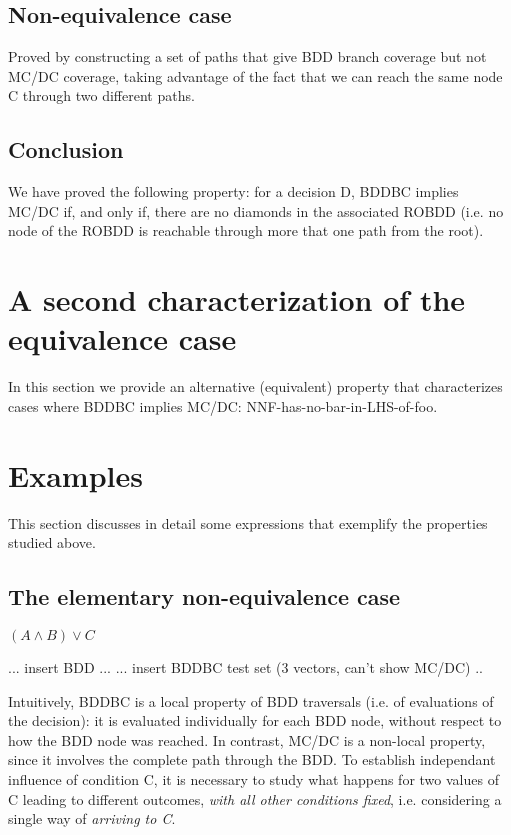 \documentclass[a4paper,12pt,twoside]{article}
\begin{document}
\subsection{Non-equivalence case}

Proved by constructing a set of paths that give BDD branch coverage but
not MC/DC coverage, taking advantage of the fact that we can reach the
same node C through two different paths.

\subsection{Conclusion}

We have proved the following property: for a decision D, BDDBC implies
MC/DC if, and only if, there are no diamonds in the associated ROBDD (i.e.
no node of the ROBDD is reachable through more that one path from the root).

\section{A second characterization of the equivalence case}

In this section we provide an alternative (equivalent) property
that characterizes cases where BDDBC implies MC/DC:
NNF-has-no-bar-in-LHS-of-foo.

\section{Examples}

This section discusses in detail some expressions that exemplify the properties
studied above.

\subsection{The elementary non-equivalence case}

$(A \land B) \lor C$

... insert BDD ...
... insert BDDBC test set (3 vectors, can't show MC/DC) ..

Intuitively, BDDBC is a local property of BDD traversals (i.e. of evaluations
of the decision): it is evaluated individually for each BDD node, without
respect to how the BDD node was reached. In contrast, MC/DC is a non-local
property, since it involves the complete path through the BDD. To establish
independant influence of condition C, it is necessary to study what happens
for two values of C leading to different outcomes, \emph{with all other
conditions fixed}, i.e. considering a single way of \emph{arriving to C}.
\end{document}

